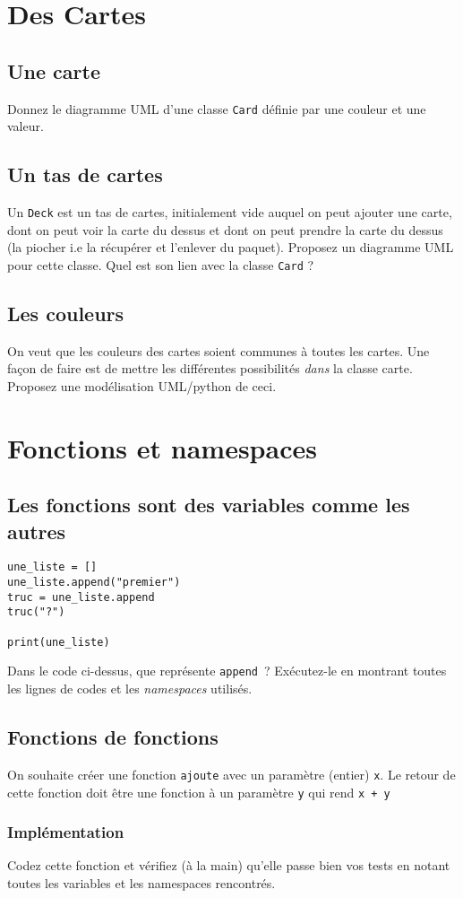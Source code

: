\documentclass[12pt]{article}
\begin{document}
\section{Des Cartes}
\subsection{Une carte}
Donnez le diagramme UML d'une classe \verb|Card| définie par une couleur et une valeur. 

\subsection{Un tas de cartes}
Un \verb|Deck| est un tas de cartes, initialement vide auquel on peut ajouter une carte, dont on peut voir la carte du
dessus et dont on peut prendre la carte du dessus (la piocher i.e la récupérer et l'enlever du paquet). Proposez un
diagramme UML pour cette classe. Quel est son lien avec la classe \verb|Card| ?

\subsection{Les couleurs}
On veut que les couleurs des cartes soient communes à toutes les cartes. Une façon de faire est de mettre les différentes possibilités {\em dans}  la classe carte. Proposez une modélisation UML/python de ceci. 

\section{Fonctions et namespaces}

\subsection{Les fonctions sont des variables comme les autres}


\lstset{language=Python}
\begin{lstlisting}
une_liste = []
une_liste.append("premier")
truc = une_liste.append
truc("?")

print(une_liste)
\end{lstlisting}


Dans le code ci-dessus, que représente \verb|append|~? Exécutez-le en montrant toutes les lignes de codes et les {\em namespaces} utilisés.


\subsection{Fonctions de fonctions}

On souhaite créer une fonction \verb|ajoute| avec un paramètre (entier) \verb|x|. Le retour de cette fonction doit être une fonction à un paramètre \verb|y| qui rend \verb|x + y|

\subsubsection{Implémentation}

Codez cette fonction et vérifiez (à la main) qu'elle passe bien vos tests en notant toutes les variables et les namespaces rencontrés.
\end{document}
